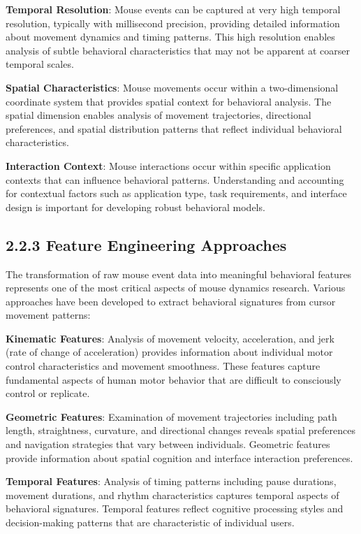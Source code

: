 \documentclass[
  12pt,
  a4paper,
]{report}
\begin{document}
\textbf{Temporal Resolution}: Mouse events can be captured at very high
temporal resolution, typically with millisecond precision, providing
detailed information about movement dynamics and timing patterns. This
high resolution enables analysis of subtle behavioral characteristics
that may not be apparent at coarser temporal scales.

\textbf{Spatial Characteristics}: Mouse movements occur within a
two-dimensional coordinate system that provides spatial context for
behavioral analysis. The spatial dimension enables analysis of movement
trajectories, directional preferences, and spatial distribution patterns
that reflect individual behavioral characteristics.

\textbf{Interaction Context}: Mouse interactions occur within specific
application contexts that can influence behavioral patterns.
Understanding and accounting for contextual factors such as application
type, task requirements, and interface design is important for
developing robust behavioral models.

\subsection{2.2.3 Feature Engineering
Approaches}\label{feature-engineering-approaches}

The transformation of raw mouse event data into meaningful behavioral
features represents one of the most critical aspects of mouse dynamics
research. Various approaches have been developed to extract behavioral
signatures from cursor movement patterns:

\textbf{Kinematic Features}: Analysis of movement velocity,
acceleration, and jerk (rate of change of acceleration) provides
information about individual motor control characteristics and movement
smoothness. These features capture fundamental aspects of human motor
behavior that are difficult to consciously control or replicate.

\textbf{Geometric Features}: Examination of movement trajectories
including path length, straightness, curvature, and directional changes
reveals spatial preferences and navigation strategies that vary between
individuals. Geometric features provide information about spatial
cognition and interface interaction preferences.

\textbf{Temporal Features}: Analysis of timing patterns including pause
durations, movement durations, and rhythm characteristics captures
temporal aspects of behavioral signatures. Temporal features reflect
cognitive processing styles and decision-making patterns that are
characteristic of individual users.
\end{document}
